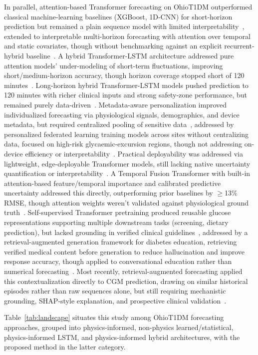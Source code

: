 \documentclass[journal]{IEEEtran}
\begin{document}
In parallel, attention-based Transformer forecasting on OhioT1DM outperformed classical machine-learning baselines (XGBoost, 1D-CNN) for short-horizon prediction but remained a plain sequence model with limited interpretability~\cite{ref19}, extended to interpretable multi-horizon forecasting with attention over temporal and static covariates, though without benchmarking against an explicit recurrent-hybrid baseline~\cite{ref20}. A hybrid Transformer-LSTM architecture addressed pure attention models' under-modeling of short-term fluctuations, improving short/medium-horizon accuracy, though horizon coverage stopped short of 120 minutes~\cite{ref21}. Long-horizon hybrid Transformer-LSTM models pushed prediction to 120 minutes with richer clinical inputs and strong safety-zone performance, but remained purely data-driven~\cite{ref22}. Metadata-aware personalization improved individualized forecasting via physiological signals, demographics, and device metadata, but required centralized pooling of sensitive data~\cite{ref23}, addressed by personalized federated learning training models across sites without centralizing data, focused on high-risk glycaemic-excursion regions, though not addressing on-device efficiency or interpretability~\cite{ref24}. Practical deployability was addressed via lightweight, edge-deployable Transformer models, still lacking native uncertainty quantification or interpretability~\cite{ref25}. A Temporal Fusion Transformer with built-in attention-based feature/temporal importance and calibrated predictive uncertainty addressed this directly, outperforming prior baselines by $\geq$13\% RMSE, though attention weights weren't validated against physiological ground truth~\cite{ref26}. Self-supervised Transformer pretraining produced reusable glucose representations supporting multiple downstream tasks (screening, dietary prediction), but lacked grounding in verified clinical guidelines~\cite{ref27}, addressed by a retrieval-augmented generation framework for diabetes education, retrieving verified medical content before generation to reduce hallucination and improve response accuracy, though applied to conversational education rather than numerical forecasting~\cite{ref28}. Most recently, retrieval-augmented forecasting applied this contextualization directly to CGM prediction, drawing on similar historical episodes rather than raw sequences alone, but still requiring mechanistic grounding, SHAP-style explanation, and prospective clinical validation~\cite{ref29}.

Table~\ref{tab:landscape} situates this study among OhioT1DM forecasting approaches, grouped into physics-informed, non-physics learned/statistical, physics-informed LSTM, and physics-informed hybrid architectures, with the proposed method in the latter category.
\end{document}
